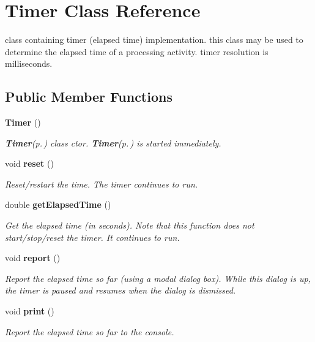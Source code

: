 \section{Timer Class Reference}
\label{class_c_s_image_viewer_1_1_timer}
class containing timer (elapsed time) implementation. this class may be used to determine the elapsed time of a processing activity. timer resolution is milliseconds.  


\subsection*{Public Member Functions}
\begin{CompactItemize}
\item 
{\bf Timer} ()
\begin{CompactList}\small\item\em {\bf Timer}{\rm (p.\,\pageref{class_c_s_image_viewer_1_1_timer})} class ctor. {\bf Timer}{\rm (p.\,\pageref{class_c_s_image_viewer_1_1_timer})} is started immediately. \item\end{CompactList}\item 
void {\bf reset} ()
\begin{CompactList}\small\item\em Reset/restart the time. The timer continues to run. \item\end{CompactList}\item 
double {\bf get\-Elapsed\-Time} ()
\begin{CompactList}\small\item\em Get the elapsed time (in seconds). Note that this function does not start/stop/reset the timer. It continues to run. \item\end{CompactList}\item 
void {\bf report} ()
\begin{CompactList}\small\item\em Report the elapsed time so far (using a modal dialog box). While this dialog is up, the timer is paused and resumes when the dialog is dismissed. \item\end{CompactList}\item 
void {\bf print} ()
\begin{CompactList}\small\item\em Report the elapsed time so far to the console. \item\end{CompactList}\end{CompactItemize}
